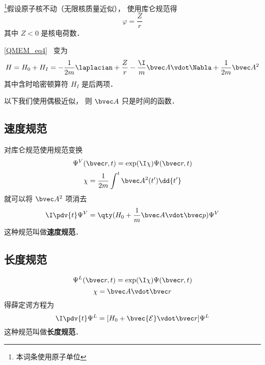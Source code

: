 

\footnote{本词条使用原子单位}假设原子核不动（无限核质量近似）， 使用库仑规范得
\begin{equation}
\varphi = \frac{Z}{r}
\end{equation}
其中 $Z < 0$ 是核电荷数．

\autoref{QMEM_eq4}~ 变为
\begin{equation}
H = H_0 + H_I = -\frac{1}{2m} \laplacian +  \frac{Z}{r} - \frac{\I}{m} \bvec A \vdot \Nabla + \frac{1}{2m} \bvec A^2
\end{equation}
其中含时哈密顿算符 $H_I$ 是后两项．

以下我们使用偶极近似， 则 $\bvec A$ 只是时间的函数．

\subsection{速度规范}
 对库仑规范使用规范变换
\begin{equation}\label{EMHydr_eq3}
\Psi^V(\bvec r, t) =  \exp(\I \chi) \Psi(\bvec r, t)
\end{equation}
\begin{equation}\label{EMHydr_eq4}
\chi = \frac{1}{2m} \int^t \bvec A^2(t') \dd{t'}
\end{equation}
就可以将 $\bvec A^2$ 项消去
\begin{equation}
\I \pdv{t} \Psi^V = \qty(H_0 + \frac{1}{m} \bvec A \vdot \bvec p) \Psi^V
\end{equation}
这种规范叫做\textbf{速度规范}．

\subsection{长度规范}

\begin{equation}
\Psi^L(\bvec r, t) =  \exp(\I \chi) \Psi(\bvec r, t)
\end{equation}
\begin{equation}
\chi = \bvec A \vdot \bvec r
\end{equation}
得薛定谔方程为
\begin{equation}
\I \pdv{t} \Psi^L = [H_0 + \bvec{\mathcal{E}} \vdot \bvec r] \Psi^L
\end{equation}
这种规范叫做\textbf{长度规范}．
